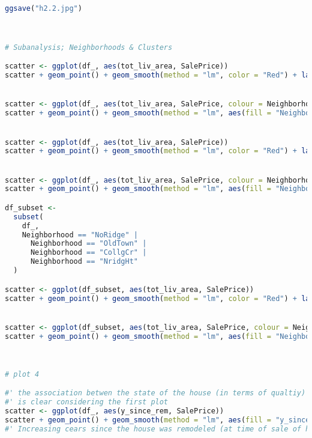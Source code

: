 \documentclass[a4paper]{article}
\begin{document}
\begin{lstlisting}[language=R]
ggsave("h2.2.jpg")



# Subanalysis; Neighborhoods & Clusters

scatter <- ggplot(df_, aes(tot_liv_area, SalePrice))
scatter + geom_point() + geom_smooth(method = "lm", color = "Red") + labs(x = 'Living space in square feet', y = "Sale Price in 1000s")


scatter <- ggplot(df_, aes(tot_liv_area, SalePrice, colour = Neighborhood))
scatter + geom_point() + geom_smooth(method = "lm", aes(fill = "Neighborhood"), alpha = 0.1) + labs(x = 'Living space in square feet', y = "Sale Price in 1000s", color = 'Neighborhood')


scatter <- ggplot(df_, aes(tot_liv_area, SalePrice))
scatter + geom_point() + geom_smooth(method = "lm", color = "Red") + labs(x = 'Living space in square feet', y = "Sale Price in 1000s") + xlim(0, 7000)


scatter <- ggplot(df_, aes(tot_liv_area, SalePrice, colour = Neighborhood))
scatter + geom_point() + geom_smooth(method = "lm", aes(fill = "Neighborhood"), alpha = 0.1) + labs(x = 'Living space in square feet', y = "Sale Price in 1000s", color = 'Neighborhood') + xlim(0, 7000)

df_subset <-
  subset(
    df_,
    Neighborhood == "NoRidge" |
      Neighborhood == "OldTown" |
      Neighborhood == "CollgCr" |
      Neighborhood == "NridgHt" 
  )

scatter <- ggplot(df_subset, aes(tot_liv_area, SalePrice))
scatter + geom_point() + geom_smooth(method = "lm", color = "Red") + labs(x = 'Living space in square feet', y = "Sale Price in 1000s") + xlim(0, 7000)


scatter <- ggplot(df_subset, aes(tot_liv_area, SalePrice, colour = Neighborhood))
scatter + geom_point() + geom_smooth(method = "lm", aes(fill = "Neighborhood"), alpha = 0.1) + labs(x = 'Living space in square feet', y = "Sale Price in 1000s", color = 'Neighborhood') + xlim(0, 7000)
 


# plot 4

#' the association betwen the state of the house (in terms of qualtiy) and the years since it was renovated/remodeled 
#' is clear considering the first plot 
scatter <- ggplot(df_, aes(y_since_rem, SalePrice))
scatter + geom_point() + geom_smooth(method = "lm", aes(fill = "y_since_rem"), alpha = 0.4) + labs(x = 'Time Since last Remodeling at point of sale', y = "Sale Price in 1000s")
#' Increasing cears since the house was remodeled (at time of sale of house) has a negative association with Sale price; as is to be expected



\end{lstlisting}
\end{document}

